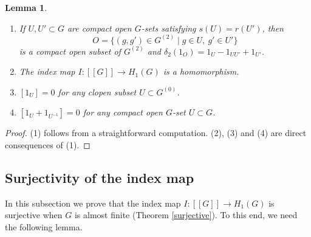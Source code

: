 \documentclass[11pt]{article}
\newtheorem{lem}[thm]{Lemma}
\theoremstyle{definition}
\begin{document}
\begin{lem}\label{H1}
\begin{enumerate}
\item If $U,U'\subset G$ are compact open $G$-sets satisfying $s(U)=r(U')$, 
then 
\[
O=\{(g,g')\in G^{(2)}\mid g\in U,\ g'\in U'\}
\]
is a compact open subset of $G^{(2)}$ and 
$\delta_2(1_O)=1_U-1_{UU'}+1_{U'}$. 
\item The index map $I:[[G]]\to H_1(G)$ is a homomorphism. 
\item $[1_U]=0$ for any clopen subset $U\subset G^{(0)}$. 
\item $[1_U+1_{U^{-1}}]=0$ for any compact open $G$-set $U\subset G$. 
\end{enumerate}
\end{lem}
\begin{proof}
(1) follows from a straightforward computation. 
(2), (3) and (4) are direct consequences of (1). 
\end{proof}


\subsection{Surjectivity of the index map}

In this subsection we prove that 
the index map $I:[[G]]\to H_1(G)$ is surjective when $G$ is almost finite 
(Theorem \ref{surjective}). 
To this end, we need the following lemma. 
\end{document}
